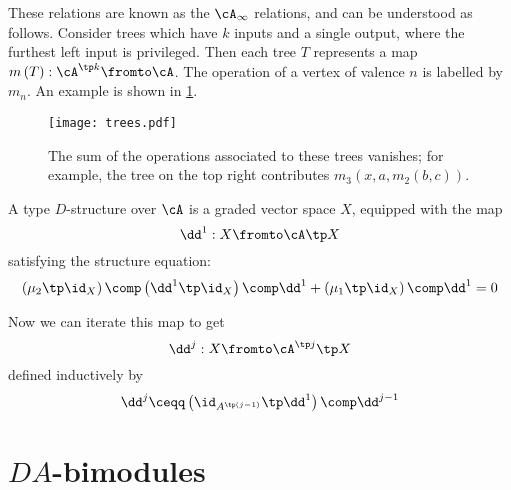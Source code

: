 \documentclass{amsproc}
\begin{document}
These relations are known as the $\cA_\infty$ relations, and
can be understood as follows.
Consider trees which have $k$ inputs and a single output, where the furthest
left input is privileged.
Then each tree $T$ represents a map $m\left( T \right):\cA^{\tp k} \fromto \cA$.
The operation of a vertex of valence $n$ is labelled by $m_n$.
An example is shown in \cref{fig:trees}.

\begin{figure}
\texttt{[image: trees.pdf]}
\caption{The sum of the operations associated to these trees vanishes; 
for example, the tree on the top right contributes
$m_3\left( x,a,m_2\left( b,c \right) \right)$.}
\label{fig:trees}
\end{figure}

A type $D$-structure over $\cA$ is a graded vector space $X$, 
equipped with the map
\begin{equation}
\dd^1: X\fromto \cA \tp X
\end{equation}
satisfying the structure equation:
\begin{equation}
\left( \mu_2 \tp \id_X \right) \comp 
\left( \dd^1 \tp \id_X \right) \comp \dd^1
+ \left( \mu_1 \tp \id_X \right) \comp \dd^1 = 0
\end{equation}

Now we can iterate this map to get
\begin{equation}
\dd^j : X\fromto \cA^{\tp j} \tp X
\end{equation}
defined inductively by
\begin{equation}
\dd^j \ceqq
\left( \id_{A^{\tp \left( j-1 \right)} }\tp \dd^1 \right)\comp
\dd^{j-1}
\end{equation}

\section{$DA$-bimodules}
\label{app:da_bimodules}

\end{document}
